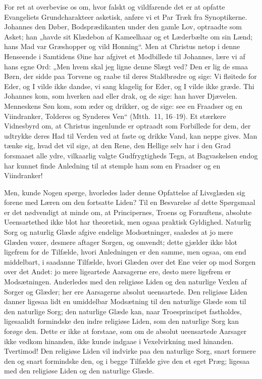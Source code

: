 \documentclass[12pt]{book}
\begin{document}
For ret at overbevise os om, hvor falskt og vildfarende det er at
opfatte Evangeliets Grundcharakteer asketisk, anføre vi et Par Træk
fra Synoptikerne. Johannes den Døber, Bodsprædikanten under den
gamle Lov, optraadte som Asket; han „havde sit Klædebon af
Kameelhaar og et Læderbælte om sin Lænd; hans Mad var Græshopper og
vild Honning“. Men at Christus netop i denne Henseende i Samtidens
Øine har afgivet et Modbillede til Johannes, lære vi af hans egne
Ord: „Men hvem skal jeg ligne denne Slægt ved? Den er lig de
smaa Børn, der sidde paa Torvene og raabe til deres Staldbrødre og
sige: Vi fløitede for Eder, og I vilde ikke dandse, vi sang klagelig
for Eder, og I vilde ikke græde. Thi Johannes kom, som hverken aad
eller drak, og de sige: han haver Djævelen. Menneskens Søn kom, som
æder og drikker, og de sige: see en Fraadser og en Viindranker,
Tolderes og Synderes Ven“ (Mtth.\ 11, 16--19). Et stærkere
Vidnesbyrd om, at Christus ingenlunde er optraadt som Forbillede for
dem, der udtrykke deres Had til Verden ved at faste og drikke Vand,
kan neppe gives. Man tænke sig, hvad det vil sige, at den Rene, den
Hellige selv har i den Grad forsmaaet alle ydre, vilkaarlig valgte
Gudfrygtigheds Tegn, at Bagvaskelsen endog har kunnet finde
Anledning til at stemple ham som en Fraadser og en Viindranker!

Men, kunde Nogen spørge, hvorledes lader denne Opfattelse af
Livsglæden sig forene med Læren om den fortsatte Liden? Til en
Besvarelse af dette Spørgsmaal er det nødvendigt at minde om, at
Principernes, Troens og Fornuftens, absolute Ueensartethed ikke blot
har theoretisk, men ogsaa praktisk Gyldighed. Naturlig Sorg og
naturlig Glæde afgive endelige Modsætninger, saaledes at jo mere
Glæden voxer, desmere aftager Sorgen, og omvendt; dette gjælder ikke
blot ligefrem for de Tilfælde, hvori Anledningen er den samme, men
ogsaa, om end middelbart, i saadanne Tilfælde, hvori Glæden over det
Ene veier op mod Sorgen over det Andet: jo mere ligeartede
Aarsagerne ere, desto mere ligefrem er Modsætningen. Anderledes med
den religiøse Liden og den naturlige Vexlen af Sorger og Glæder; her
ere Aarsagerne absolut ueensartede. Den religiøse Liden danner
ligesaa lidt en umiddelbar Modsætning til den naturlige Glæde som
til den naturlige Sorg; den naturlige Glæde kan, naar Troesprincipet
fastholdes, ligesaalidt formindske den indre religiøse Liden, som
den naturlige Sorg kan forøge den.
Dette er ikke at forstaae, som om de absolut ueensartede Aarsager
ikke vedkom hinanden, ikke kunde indgaae i Vexelvirkning med
hinanden. Tvertimod! Den religiøse Liden vil indvirke paa den
naturlige Sorg, snart formere den og snart formindske den, og i
begge Tilfælde give den et eget Præg; ligesaa med den religiøse
Liden og den naturlige Glæde.
\end{document}
